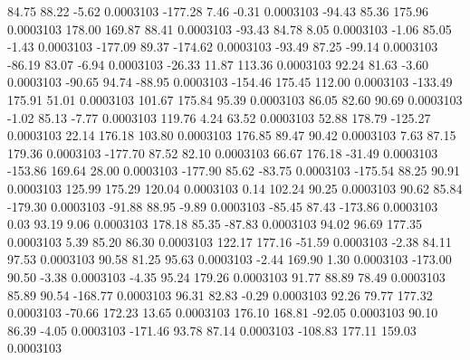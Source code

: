        84.75       88.22       -5.62     0.0003103
     -177.28        7.46       -0.31     0.0003103
      -94.43       85.36      175.96     0.0003103
      178.00      169.87       88.41     0.0003103
      -93.43       84.78        8.05     0.0003103
       -1.06       85.05       -1.43     0.0003103
     -177.09       89.37     -174.62     0.0003103
      -93.49       87.25      -99.14     0.0003103
      -86.19       83.07       -6.94     0.0003103
      -26.33       11.87      113.36     0.0003103
       92.24       81.63       -3.60     0.0003103
      -90.65       94.74      -88.95     0.0003103
     -154.46      175.45      112.00     0.0003103
     -133.49      175.91       51.01     0.0003103
      101.67      175.84       95.39     0.0003103
       86.05       82.60       90.69     0.0003103
       -1.02       85.13       -7.77     0.0003103
      119.76        4.24       63.52     0.0003103
       52.88      178.79     -125.27     0.0003103
       22.14      176.18      103.80     0.0003103
      176.85       89.47       90.42     0.0003103
        7.63       87.15      179.36     0.0003103
     -177.70       87.52       82.10     0.0003103
       66.67      176.18      -31.49     0.0003103
     -153.86      169.64       28.00     0.0003103
     -177.90       85.62      -83.75     0.0003103
     -175.54       88.25       90.91     0.0003103
      125.99      175.29      120.04     0.0003103
        0.14      102.24       90.25     0.0003103
       90.62       85.84     -179.30     0.0003103
      -91.88       88.95       -9.89     0.0003103
      -85.45       87.43     -173.86     0.0003103
        0.03       93.19        9.06     0.0003103
      178.18       85.35      -87.83     0.0003103
       94.02       96.69      177.35     0.0003103
        5.39       85.20       86.30     0.0003103
      122.17      177.16      -51.59     0.0003103
       -2.38       84.11       97.53     0.0003103
       90.58       81.25       95.63     0.0003103
       -2.44      169.90        1.30     0.0003103
     -173.00       90.50       -3.38     0.0003103
       -4.35       95.24      179.26     0.0003103
       91.77       88.89       78.49     0.0003103
       85.89       90.54     -168.77     0.0003103
       96.31       82.83       -0.29     0.0003103
       92.26       79.77      177.32     0.0003103
      -70.66      172.23       13.65     0.0003103
      176.10      168.81      -92.05     0.0003103
       90.10       86.39       -4.05     0.0003103
     -171.46       93.78       87.14     0.0003103
     -108.83      177.11      159.03     0.0003103
